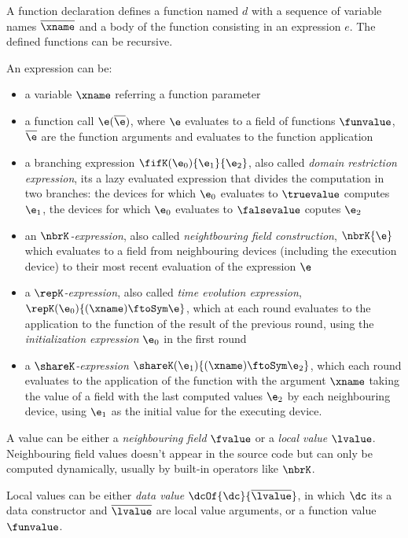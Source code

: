 A function declaration defines a function named $d$ with a sequence of variable names $\overline{\xname}$ and a body of the function consisting in an expression $e$. The defined functions can be recursive.

An expression can be:
\begin{itemize}
\item a variable $\xname$ referring a function parameter
\item a function call $\e(\overline{\e})$, where $\e$ evaluates to a field of functions $\funvalue$, $\overline{\e}$ are the function arguments and evaluates to the function application
\item a {branching expression} $\fifK (\e_0) \{\e_1\} \{\e_2\}$, also called  \textit{domain restriction expression}, its a lazy evaluated expression that divides the computation in two branches: the devices for which $\e_0$ evaluates to $\truevalue$ computes $\e_1$, the devices for which $\e_0$ evaluates to $\falsevalue$ coputes $\e_2$
\item an \textit{$\nbrK$-expression}, also called \textit{neightbouring field construction}, $\nbrK\{\e\}$ which evaluates to a field from neighbouring devices (including the execution device) to their most recent evaluation of the expression $\e$
\item a \textit{$\repK$-expression}, also called \textit{time evolution expression}, $\repK(\e_0)\{ (\xname) \ftoSym \e \}$, which at each round evaluates to the application to the function of the result of the previous round, using the \textit{initialization expression} $\e_0$ in the first round
\item a \textit{$\shareK$-expression} $\shareK(\e_1)\{(\xname) \ftoSym \e_2 \}$, which each round evaluates to the application of the function with the argument $\xname$ taking the value of a field with the last computed values $\e_2$ by each neighbouring device, using $\e_1$ as the initial value for the executing device.
\end{itemize}

A value can be either a \textit{neighbouring field} $\fvalue$ or a \textit{local value} $\lvalue$. Neighbouring field values doesn't appear in the source code but can only be computed dynamically, usually by built-in operators like $\nbrK$.

Local values can be either \textit{data value} $\dcOf{\dc}{\overline\lvalue}$, in which $\dc$ its a data constructor and $\overline \lvalue$ are local value arguments, or a function value $\funvalue$.

